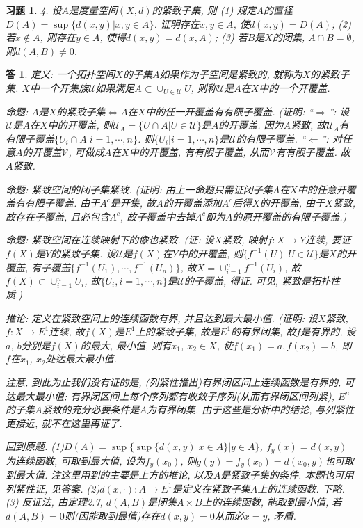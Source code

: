 \documentclass{ctexart}%
\newtheorem*{exercise}{习题}
\newtheorem*{solution}{答}
\theoremstyle{definition}
\theoremstyle{remark}
\begin{document}
\begin{exercise}4. 设$A$是度量空间$(X,d)$的紧致子集, 则
(1) 规定$A$的直径$D(A)=\sup\{d(x,y)|x,y\in A\}$. 证明存在$x,y\in A$, 使$d(x,y)=D(A)$; (2) 若$x\notin A$, 则存在$y\in A$, 使得$d(x,y)=d(x,A)$; (3) 若$B$是$X$的闭集, $A\cap B=\emptyset$, 则$d(A,B)\neq 0$.
\end{exercise}
\begin{solution}
定义: 一个拓扑空间$X$的子集$A$如果作为子空间是紧致的, 就称为$X$的紧致子集. $X$中一个开集族$\mathscr{U}$如果满足$A\subset \cup_{U\in\mathscr{U}} U$, 则称$\mathscr{U}$是$A$在$X$中的一个开覆盖.

命题: $A$是$X$的紧致子集$\Longleftrightarrow A$在$X$中的任一开覆盖有有限子覆盖. (证明: ``$\Longrightarrow$'': 设$\mathscr{U}$是$A$在$X$中的开覆盖, 则$\mathscr{U}_A=\{U\cap A|U\in \mathscr{U}\}$是$A$的开覆盖. 因为$A$紧致, 故$\mathscr{U}_A$有有限子覆盖$\{U_i\cap A|i=1,\cdots,n\}$. 则$\{U_i|i=1,\cdots,n\}$是$\mathscr{U}$的有限子覆盖. ``$\Longleftarrow$'': 对任意$A$的开覆盖$\mathscr{V}$, 可做成$A$在$X$中的开覆盖, 有有限子覆盖, 从而$\mathscr{V}$有有限子覆盖. 故$A$紧致. 

命题: 紧致空间的闭子集紧致. (证明: 由上一命题只需证闭子集$A$在$X$中的任意开覆盖有有限子覆盖. 由于$A^c$是开集, 故$A$的开覆盖添加$A^c$后得$X$的开覆盖, 由于$X$紧致, 故存在子覆盖, 且必包含$A^c$, 故子覆盖中去掉$A^c$即为$A$的原开覆盖的有限子覆盖.)

 命题: 紧致空间在连续映射下的像也紧致.  (证: 设$X$紧致, 映射$f:X\rightarrow Y$连续, 要证$f(X)$是$Y$的紧致子集. 设$\mathscr{U}$是$f(X)$在$Y$中的开覆盖, 则$\{f^{-1}(U)|U\in\mathscr{U}\}$是$X$的开覆盖, 有子覆盖$\{f^{-1}(U_1),\cdots, f^{-1}(U_n)\}$, 故$X=\cup_{i=1}^nf^{-1} (U_i)$, 故$f(X)\subset \cup_{i=1}^n U_i$, 故$\{U_i,i=1,\cdots, n\}$是$\mathscr{U}$的子覆盖, 得证. 可见, 紧致是拓扑性质.)
 
 推论: 定义在紧致空间上的连续函数有界, 并且达到最大最小值. (证明: 设$X$紧致, $f: X\rightarrow E^1$连续, 故$f(X)$是$E^1$上的紧致子集, 故是$E^1$的有界闭集, 故$f$是有界的, 设$a$, $b$分别是$f(X)$的最大, 最小值, 则有$x_1$, $x_2\in X$, 使$f(x_1)=a, f(x_2)=b$, 即$f$在$x_1$, $x_2$处达最大最小值. 

注意, 到此为止我们没有证的是, (列紧性推出)有界闭区间上连续函数是有界的, 可达最大最小值; 有界闭区间上每个序列都有收敛子序列(从而有界闭区间列紧), $E^n$的子集$A$紧致的充分必要条件是$A$为有界闭集. 由于这些是分析中的结论, 与列紧性更接近, 就不在这里再证了. 

 回到原题. (1)$D(A)=\sup\{\sup\{d(x,y)|x\in A\}|y\in A\}$, $f_y(x)=d(x,y)$为连续函数, 可取到最大值, 设为$f_y(x_0)$, 则$g(y)=f_y(x_0)=d(x_0,y)$也可取到最大值. 注这里用到的主要是上方的推论, 以及$A$是紧致子集的条件. 本题也可用列紧性证, 见答案. (2)$d(x,\cdot): A\rightarrow E^1$是定义在紧致子集$A$上的连续函数. 下略. (3) 反证法, 由定理2.7, $d(A,B)$是闭集$A\times B$上的连续函数, 能取到最小值, 若$d(A,B)=0$则(因能取到最值)存在$d(x,y)=0$从而必$x=y$, 矛盾. 
\end{solution}
\end{document}
